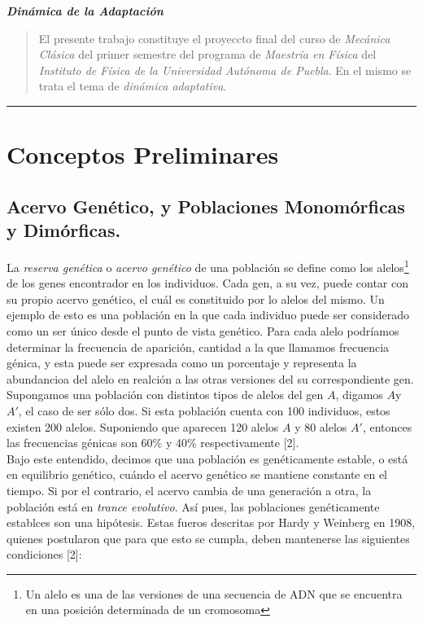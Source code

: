 \documentclass[letterpaper]{article}
\newcommand{\Title}[1]{\begin{center} \LARGE{\textbf{\textit{#1}}} \end{center}}
\newcommand{\Abstract}[1]{\begin{abstract} \normalsize{#1} \end{abstract}}
\begin{document}
\Title{Dinámica de la Adaptación}

    \Abstract{El presente trabajo constituye el proyeccto final del curso de \textit{Mecánica Clásica} del primer semestre del programa de \textit{Maestría en Física} del \textit{Instituto de Física de la Universidad Autónoma de Puebla}. En el mismo se trata el tema de \textit{dinámica adaptativa}.}

    \tableofcontents

    \clearpage

    

    \vspace{0.2cm}
        \rule{150mm}{0.5mm} %
    \vspace{0.2cm}

    \section{Conceptos Preliminares}{

        \subsection{Acervo Genético, y Poblaciones Monomórficas y Dimórficas.}{

            \normalsize{La \textit{reserva genética} o \textit{acervo genético} de una población se define como los alelos\footnote{Un alelo es una de las versiones de una secuencia de ADN que se encuentra en una posición determinada de un cromosoma} de los genes encontrador en los individuos. Cada gen, a su vez, puede contar con su propio acervo genético, el cuál es constituido por lo alelos del mismo. Un ejemplo de esto es una población en la que cada individuo puede ser considerado como un ser único desde el punto de vista genético. Para cada alelo podríamos determinar la frecuencia de aparición, cantidad a la que llamamos frecuencia génica, y esta puede ser expresada como un porcentaje y representa la abundancioa del alelo en realción a las otras versiones del su correspondiente gen. Supongamos una población con distintos tipos de alelos del gen $A$, digamos $A$y $A'$, el caso de ser sólo dos. Si esta población cuenta con 100 individuos, estos existen 200 alelos. Suponiendo que aparecen 120 alelos $A$ y 80 alelos $A'$, entonces las frecuencias génicas son 60\% y 40\% respectivamente [2].}\\

            \normalsize{Bajo este entendido, decimos que una población es genéticamente estable, o está en equilibrio genético, cuándo el acervo genético se mantiene constante en el tiempo. Si por el contrario, el acervo cambia de una generación a otra, la población está en \textit{trance evolutivo}. Así pues, las poblaciones genéticamente establces son una hipótesis. Estas fueros descritas por Hardy y Weinberg en 1908, quienes postularon que para que esto se cumpla, deben mantenerse las siguientes condiciones [2]:}

}}
\end{document}
